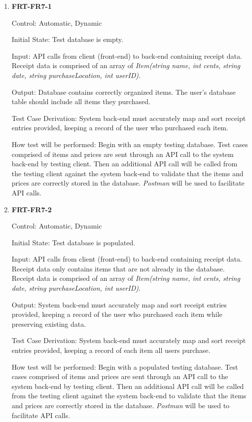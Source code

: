 \documentclass[12pt, titlepage]{article}
\begin{document}
\begin{enumerate}

\item{\textbf{FRT-FR7-1}}

Control: Automatic, Dynamic
          
Initial State: Test database is empty.

Input: API calls from client (front-end) to back-end containing receipt data. Receipt data is comprised of an array of \textit{Item(string name, int cents, string date, string purchaseLocation, int userID)}.
          
Output: Database contains correctly organized items. The user's database table should include all items they purchased.

Test Case Derivation: System back-end must accurately map and sort receipt entries provided, keeping a record of the user who purchased each item.
          
How test will be performed: Begin with an empty testing database. Test cases comprised of items and prices are sent through an API call to the system back-end by testing client. Then an additional API call will be called from the testing client against the system back-end to validate that the items and prices are correctly stored in the database. \textit{Postman} will be used to facilitate API calls. 

\item{\textbf{FRT-FR7-2}}

Control: Automatic, Dynamic
          
Initial State: Test database is populated.

Input: API calls from client (front-end) to back-end containing receipt data. Receipt data only contains items that are not already in the database. Receipt data is comprised of an array of \textit{Item(string name, int cents, string date, string purchaseLocation, int userID)}.
          
Output: System back-end must accurately map and sort receipt entries provided, keeping a record of the user who purchased each item while preserving existing data.

Test Case Derivation: System back-end must accurately map and sort receipt entries provided, keeping a record of each item all users purchase.
          
How test will be performed: Begin with a populated testing database. Test cases comprised of items and prices are sent through an API call to the system back-end by testing client. Then an additional API call will be called from the testing client against the system back-end to validate that the items and prices are correctly stored in the database. \textit{Postman} will be used to facilitate API calls. 


\end{enumerate}
\end{document}
